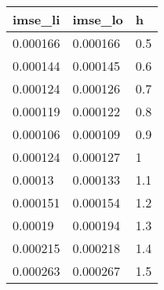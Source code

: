 \begin{tabular}{lll}
  \hline
imse\_li & imse\_lo & h \\ 
  \hline
0.000166 & 0.000166 & 0.5 \\ 
  0.000144 & 0.000145 & 0.6 \\ 
  0.000124 & 0.000126 & 0.7 \\ 
  0.000119 & 0.000122 & 0.8 \\ 
  0.000106 & 0.000109 & 0.9 \\ 
  0.000124 & 0.000127 & 1 \\ 
  0.00013 & 0.000133 & 1.1 \\ 
  0.000151 & 0.000154 & 1.2 \\ 
  0.00019 & 0.000194 & 1.3 \\ 
  0.000215 & 0.000218 & 1.4 \\ 
  0.000263 & 0.000267 & 1.5 \\ 
   \hline
\end{tabular}
